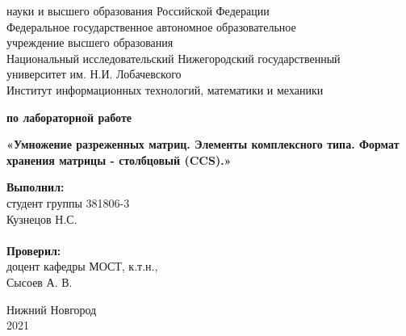 \documentclass{report}
\begin{document}
	
\begin{titlepage}
	
	\begin{center}
		 науки и высшего образования Российской Федерации\\[\baselineskip]
		Федеральное государственное автономное образовательное\\
		учреждение высшего образования \\
		Национальный исследовательский Нижегородский государственный\\
		университет им. Н.И. Лобачевского\\[\baselineskip]
		Институт информационных технологий, математики и механики \\
	\end{center}
	
	\vspace{4em}
	
	\begin{center}
		\textbf{ по лабораторной работе} \\
	\end{center}

	\begin{center}
		\textbf{\LARGE«Умножение разреженных матриц. Элементы комплексного типа. Формат хранения матрицы - столбцовый (CCS).»} \\
	\end{center}
	
	\vspace{10em}
	
	\hfill\parbox{6cm}{
		\hspace*{5cm}\hspace*{-5cm}\textbf{Выполнил:} \\ студент группы 381806-3 \\ Кузнецов Н.С. \\
		\\
		\hspace*{5cm}\hspace*{-5cm}\textbf{Проверил:}\\ доцент кафедры МОСТ, к.т.н., \\ Сысоев А. В.
	}
	
	\vspace{\fill}
	
	\begin{center} 
		Нижний Новгород \\ 2021 
	\end{center}
	
\end{titlepage}
\end{document}
